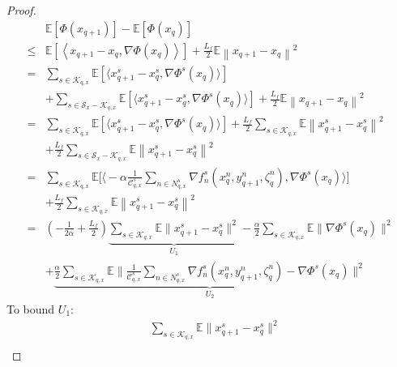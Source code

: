 \documentclass[lettersize,journal]{IEEEtran}
\begin{document}
\begin{proof}
\begin{align*}
    & \mathbb{E}\left[\Phi(x_{q+1})\right]-\mathbb{E}\left[\Phi(x_q)\right] \nonumber\\
    \leq & \mathbb{E}\left[\left\langle x_{q+1} - x_q, \nabla \Phi(x_q) \right\rangle\right] +\frac{L_f}{2} \mathbb{E}\left\|x_{q+1} -x_q\right\|^2\\
    =&\sum_{s\in \mathcal{K}_{q,x}}\mathbb{E}[\langle x_{q+1}^s-x_{q}^s, \nabla \Phi^s(x_{q})\rangle]\nonumber\\
&+\sum_{s\in \mathcal{S}_x-\mathcal{K}_{q,x}}\mathbb{E}[\langle x_{q+1}^s-x_{q}^s,\nabla \Phi^s(x_{q})\rangle]+\frac{L_f}{2} \mathbb{E}\left\|x_{q+1} -x_q\right\|^2\\
    =&\sum_{s\in \mathcal{K}_{q,x}}\mathbb{E}[\langle x_{q+1}^s-x_{q}^s, \nabla \Phi^s(x_{q})\rangle]+\frac{L_f}{2} \sum_{s\in \mathcal{K}_{q,x}}\mathbb{E}\left\|x_{q+1}^s -x_q^s\right\|^2\nonumber\\
&+\frac{L_f}{2}\sum_{s\in \mathcal{S}_x-\mathcal{K}_{q,x}}\mathbb{E}\left\|x_{q+1}^s -x_q^s\right\|^2\\
    =&\sum_{s\in \mathcal{K}_{q,x}} \mathbb{E} \bigg[\Big\langle -\alpha\frac{1}{\mathcal{C}^{s}_{q,x}}\sum_{n\in N_{q,x}^{s}}\nabla f^s_n(x_{q}^n,y_{q+1}^n,\zeta_q^n),\nabla \Phi^s(x_{q})\Big\rangle\bigg]\nonumber\\
&+\frac{L_f}{2} \sum_{s\in \mathcal{K}_{q,x}}\mathbb{E}\left\|x_{q+1}^s -x_q^s\right\|^2\\
    =&(-\frac{1}{2\alpha}+\frac{L_f}{2})\underbrace{\sum_{s\in \mathcal{K}_{q,x}}\mathbb{E}\|x_{q+1}^s -x_q^s\|^2}_{U_1}-\frac{\alpha}{2}\sum_{s\in \mathcal{K}_{q,x}}\mathbb{E}\|\nabla \Phi^s(x_{q})\|^2\\
    &+\underbrace{\frac{\alpha}{2}\sum_{s\in \mathcal{K}_{q,x}}\mathbb{E}\|\frac{1}{\mathcal{C}^{s}_{q,x}}\sum_{n\in N^{s}_{q,x}}\nabla f^s_n(x_{q}^n,y_{q+1}^n,\zeta_q^n)-\nabla \Phi^s(x_{q})\|^2}_{U_2} 
\end{align*}
To bound $U_1$:
\begin{align*}
    &\sum_{s\in \mathcal{K}_{q,x}}\mathbb{E}\|x_{q+1}^s -x_q^s\|^2\\

\end{align*}
\end{proof}
\end{document}
